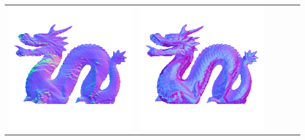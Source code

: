 \begin{tabularx}{\linewidth}{@{}Y@{}Y@{}Y@{}Y@{}Y@{}Y@{}}
\includegraphics[width=\linewidth]{semisynthetic/20150514_21_yu_out.png} &
\includegraphics[width=\linewidth]{semisynthetic/20150514_21_dpsn_out.png} &

\end{tabularx}
